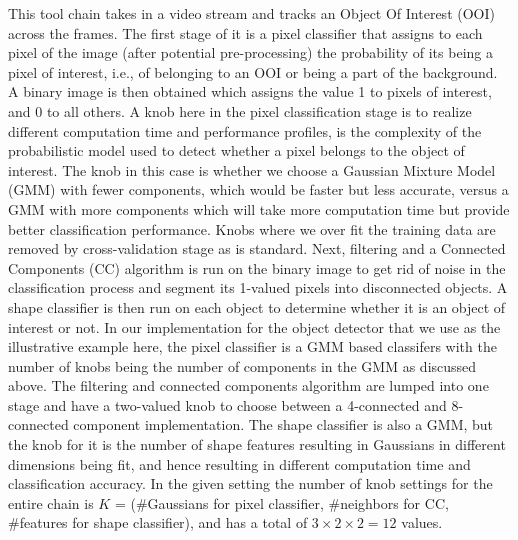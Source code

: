 This tool chain takes in a video stream and tracks an Object Of Interest (OOI) across the frames. The first stage of it is a pixel classifier that assigns to each pixel of the image (after potential pre-processing) the probability of its being a pixel of interest, i.e., of belonging to an OOI or being a part of the background. A binary image is then obtained which assigns the value 1 to pixels of interest, and 0 to all others. A knob here in the pixel classification stage is to realize different computation time and performance profiles, is the complexity of the probabilistic model used to detect whether a pixel belongs to the object of interest. The knob in this case is whether we choose a Gaussian Mixture Model (GMM) with fewer components, which would be faster but less accurate, versus a GMM with more components which will take more computation time but provide better classification performance. Knobs where we over fit the training data are removed by cross-validation stage as is standard. Next, filtering and a Connected Components (CC) algorithm is run on the binary image to get rid of noise in the classification process and segment its 1-valued pixels into disconnected objects. A shape classifier is then run on each object to determine whether it is an object of interest or not.
In our implementation for the object detector that we use as the illustrative example here, the pixel classifier is a GMM based classifers with the number of knobs being the number of components in the GMM as discussed above. The filtering and connected components algorithm are lumped into one stage and have a two-valued knob to choose between a 4-connected and 8-connected component implementation. The shape classifier is also a GMM, but the knob for it is the number of shape features resulting in Gaussians in different dimensions being fit, and hence resulting in different computation time and classification accuracy.
In the given setting the number of knob settings for the entire chain is $K$ = (\#Gaussians for pixel classifier, \#neighbors for CC, \#features for shape classifier), and has a total of $3 \times 2 \times 2 = 12$ values.

